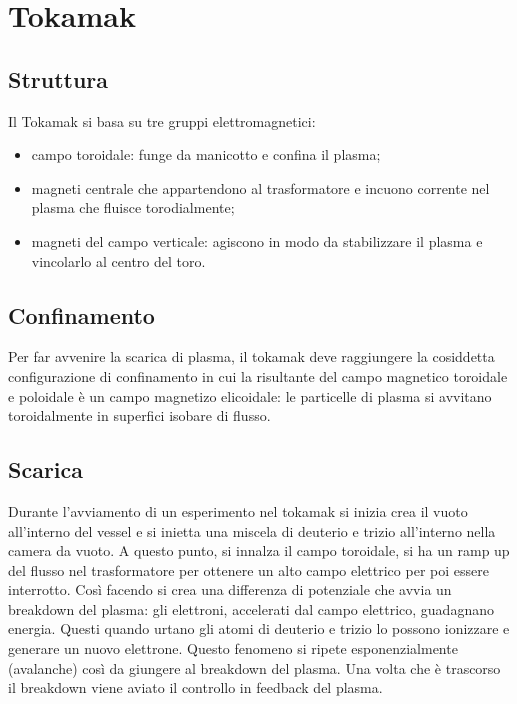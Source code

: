 \documentclass{article}
\begin{document}
\newtheorem{definizione}{Definizione}

\tableofcontents
\section{Tokamak}
\subsection{Struttura}
Il Tokamak si basa su tre gruppi elettromagnetici:\begin{itemize}
	\item campo toroidale: funge da manicotto e confina il plasma;
	\item magneti centrale che appartendono al trasformatore e incuono corrente nel plasma che fluisce torodialmente;
	\item magneti del campo verticale: agiscono in modo da stabilizzare il plasma e vincolarlo al centro del toro.
\end{itemize}
\subsection{Confinamento}
Per far avvenire la scarica di plasma, il tokamak deve raggiungere la cosiddetta configurazione di confinamento in cui la risultante del campo magnetico toroidale e poloidale è un campo magnetizo elicoidale: le particelle di plasma si avvitano toroidalmente in superfici isobare di flusso.
\subsection{Scarica}
Durante l'avviamento di un esperimento nel tokamak si inizia crea il vuoto all'interno del vessel e si inietta una miscela di deuterio e trizio all'interno nella camera da vuoto. A questo punto, si innalza il campo toroidale, si ha un ramp up del flusso nel trasformatore per ottenere un alto campo elettrico per poi essere interrotto. Così facendo si crea una differenza di potenziale che avvia un breakdown del plasma: gli elettroni, accelerati dal campo elettrico, guadagnano energia. Questi quando urtano gli atomi di deuterio e trizio lo possono ionizzare e generare un nuovo elettrone. Questo fenomeno si ripete esponenzialmente (avalanche) così da giungere al breakdown del plasma.\newline
Una volta che è trascorso il breakdown viene aviato il controllo in feedback del plasma.
\end{document}
